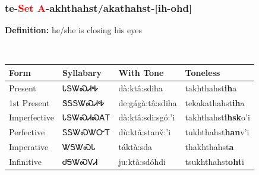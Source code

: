 \subsubsection*{te{-}\textcolor{Red}{Set A}{-}\textbf{akhthahst/akathahst}{-}[ih-ohd]}
\nopagebreak
\textbf{Definition: } he/she is closing his eyes
\\[0.5em]
\begin{tabularx}{\textwidth}{l X X X}%
\toprule%
\textbf{Form}&\textbf{Syllabary}&\textbf{With Tone}&\textbf{Toneless}\\%
\midrule%
Present&ᏓᎦᏔᏍᏗᎭ&dà:ktâ:sdiha&takhthahst\textbf{ih}a\\%
1st Present&ᏕᎦᎦᏔᏍᏗᎭ&de:gágà:tâ:sdiha&tekakathahst\textbf{ih}a\\%
Imperfective&ᏓᎦᏔᏍᏗᏍᎪᎢ&dà:ktâ:sdi:sgó:’i&takhthahst\textbf{ihsk}o'i\\%
Perfective&ᏚᎦᏔᏍᏔᏅᎢ&dù:ktâ:stanv̌:’i&tukhthahst\textbf{han}v'i\\%
Imperative&ᏔᎦᏔᏍᏓ&táktà:sda&thakhthahst\textbf{a}\\%
Infinitive&ᏧᎦᏔᏍᏙᏗ&ju:ktà:sdóhdi&tsukhthahst\textbf{oht}i\\%
\bottomrule%
\end{tabularx}
\\[1em]